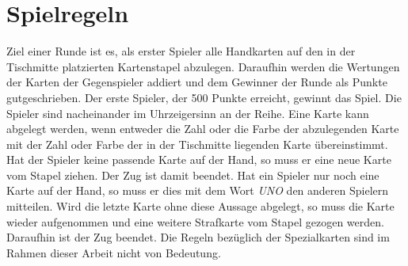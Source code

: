 \section{Spielregeln}
Ziel einer Runde ist es, als erster Spieler alle Handkarten auf den in der Tischmitte platzierten Kartenstapel abzulegen. Daraufhin werden die Wertungen der Karten der Gegenspieler addiert und dem Gewinner der Runde als Punkte gutgeschrieben. Der erste Spieler, der 500 Punkte erreicht, gewinnt das Spiel. Die Spieler sind nacheinander im Uhrzeigersinn an der Reihe. Eine Karte kann abgelegt werden, wenn entweder die Zahl oder die Farbe der abzulegenden Karte mit der Zahl oder Farbe der in der Tischmitte liegenden Karte übereinstimmt. Hat der Spieler keine passende Karte auf der Hand, so muss er eine neue Karte vom Stapel ziehen. Der Zug ist damit beendet. Hat ein Spieler nur noch eine Karte auf der Hand, so muss er dies mit dem Wort \textit{UNO} den anderen Spielern mitteilen. Wird die letzte Karte ohne diese Aussage abgelegt, so muss die Karte wieder aufgenommen und eine weitere Strafkarte vom Stapel gezogen werden. Daraufhin ist der Zug beendet. Die Regeln bezüglich der Spezialkarten sind im Rahmen dieser Arbeit nicht von Bedeutung.